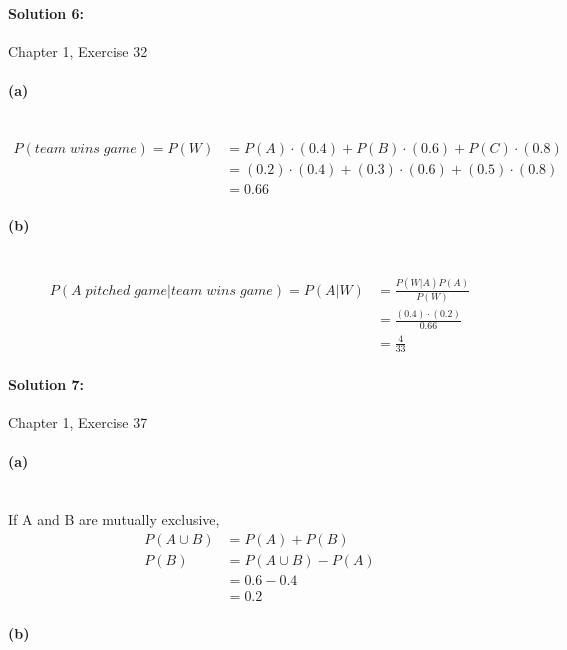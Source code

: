 \documentclass[a4paper]{article}
\begin{document}
\paragraph{Solution 6:}
Chapter 1, Exercise 32

\paragraph{(a)} ~\\
\begin{align*}
P(team \; wins \; game) = P(W) &= P(A) \cdot (0.4) + P(B) \cdot (0.6) + P(C) \cdot (0.8) \\
                               &= (0.2) \cdot (0.4) + (0.3) \cdot (0.6) + (0.5) \cdot (0.8) \\
                               &= 0.66
\end{align*}

\paragraph{(b)} ~\\
\begin{align*}
P(A \; pitched \; game|team \; wins \; game) = P(A|W) &= \frac{P(W|A)P(A)}{P(W)} \\
                                                      &= \frac{(0.4) \cdot (0.2)}{0.66} \\
                                                      &= \frac{4}{33}
\end{align*}

\paragraph{Solution 7:}
Chapter 1, Exercise 37

\paragraph{(a)} ~\\

\indent If A and B are mutually exclusive,
\begin{align*}
P(A \cup B) &= P(A) + P(B) \\
       P(B) &= P(A \cup B) - P(A) \\
            &= 0.6 - 0.4 \\
            &= 0.2
\end{align*}

\paragraph{(b)} ~\\
\end{document}
